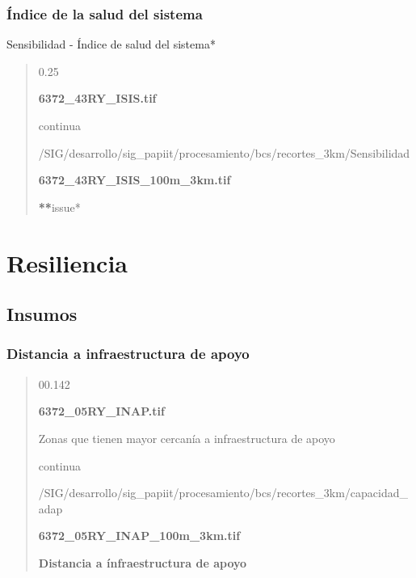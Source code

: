 \documentclass[letterpaper,10pt,spanish]{sphinxmanual}
\begin{document}
\subsection{Índice de la salud del sistema}
\label{\detokenize{sensibilidad_bcs:indice-de-la-salud-del-sistema}}
Sensibilidad - Índice de salud del sistema*
\begin{quote}

 0.25

 {\color{red}\bfseries{}\textbar{}6372\_43RY\_ISIS.tif\textbar{}}


 continua


 /SIG/desarrollo/sig\_papiit/procesamiento/bcs/recortes\_3km/Sensibilidad

  {\color{red}\bfseries{}\textbar{}6372\_43RY\_ISIS\_100m\_3km.tif\textbar{}}

{\color{red}\bfseries{}**}issue* 
\end{quote}


\chapter{Resiliencia}
\label{\detokenize{resiliencia_bcs:resiliencia}}\label{\detokenize{resiliencia_bcs::doc}}

\section{Insumos}
\label{\detokenize{resiliencia_bcs:insumos}}

\subsection{Distancia a infraestructura de apoyo}
\label{\detokenize{resiliencia_bcs:distancia-a-infraestructura-de-apoyo}}
\begin{quote}

 00.142

 {\color{red}\bfseries{}\textbar{}6372\_05RY\_INAP.tif\textbar{}}

 Zonas que tienen mayor cercanía a infraestructura de apoyo

 continua


 /SIG/desarrollo/sig\_papiit/procesamiento/bcs/recortes\_3km/capacidad\_adap

  {\color{red}\bfseries{}\textbar{}6372\_05RY\_INAP\_100m\_3km.tif\textbar{}}

 {\color{red}\bfseries{}\textbar{}Distancia a ínfraestructura de apoyo\textbar{}}
\end{quote}
\end{document}
